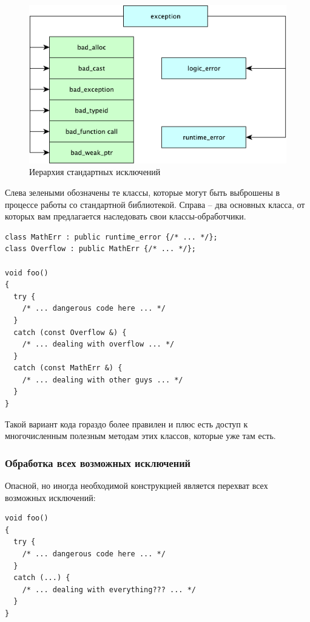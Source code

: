 \documentclass[a4paper,12pt,oneside]{article}
\begin{document}
\begin{figure}[h!]
\centering
\includegraphics[width=1.0\textwidth]{illustrations/exc-hier-crop.pdf}
\caption{Иерархия стандартных исключений}
\label{fig:exc_hier}
\end{figure}

Слева зелеными обозначены те классы, которые могут быть выброшены в процессе работы со стандартной библиотекой. Справа -- два основных класса, от которых вам предлагается наследовать свои классы-обработчики.

\begin{lstlisting}
class MathErr : public runtime_error {/* ... */};
class Overflow : public MathErr {/* ... */};

void foo()
{
  try {
    /* ... dangerous code here ... */
  }
  catch (const Overflow &) {
    /* ... dealing with overflow ... */
  }
  catch (const MathErr &) {
    /* ... dealing with other guys ... */
  }
}
\end{lstlisting}

Такой вариант кода гораздо более правилен и плюс есть доступ к многочисленным полезным методам этих классов, которые уже там есть.

\subsubsection{Обработка всех возможных исключений}\label{CatchAll}

Опасной, но иногда необходимой конструкцией является перехват всех возможных исключений:

\begin{lstlisting}
void foo()
{
  try {
    /* ... dangerous code here ... */
  }
  catch (...) {
    /* ... dealing with everything??? ... */
  }
}
\end{lstlisting}
\end{document}
